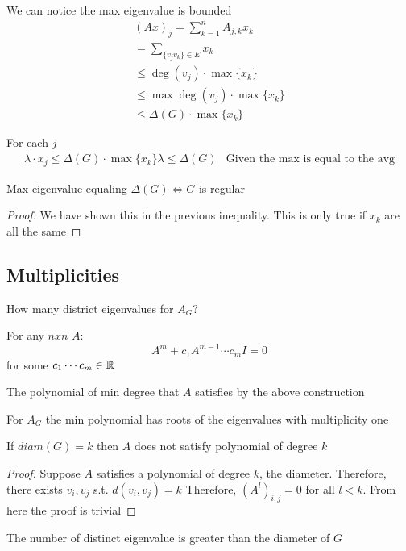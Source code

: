 We can notice the max eigenvalue is bounded
\begin{eqnarray*}
    (Ax)_j = \sum_{k = 1}^{n} A_{j,k} x_k \\ 
    = \sum_{\{v_jv_k\} \in E} x_k \\
    \leq \deg(v_j) \cdot \max\{x_k\} \\
    \leq \max \deg(v_j) \cdot \max\{x_k\} \\
    \leq \Delta(G) \cdot \max\{x_k\}
\end{eqnarray*}

For each \(j\)
\begin{eqnarray*}
    \lambda \cdot x_j \leq \Delta(G) \cdot \max \{x_k\}
    \lambda \leq \Delta(G) & \text{Given the max is equal to the avg} 
\end{eqnarray*}

\begin{theorem}[test]
    \label{thm:test}
    Max eigenvalue equaling \(\Delta (G) \iff G\) is regular 
\end{theorem} 
\begin{proof}
    We have shown this in the previous inequality. This is only true if \(x_k\) are all the same
\end{proof}

\subsection{Multiplicities}

\begin{question}
    How many district eigenvalues for \(A_G\)?
\end{question}

\begin{proposition}
    For any \(n x n\) \(A\):
    \[
        A^m + c_1 A^{m-1} \cdots c_m I = 0 
    \]
    for some \(c_1 \cdots c_m \in \mathbb{R}\)
\end{proposition}

\begin{definition}
    \label{def:min polynomial}
    The polynomial of min degree that \(A\) satisfies by the above construction

    For \(A_G\) the min polynomial has roots of the eigenvalues with multiplicity one
\end{definition}  

\begin{proposition}
    If \(diam(G) = k\) then \(A\) does not satisfy polynomial of degree \(k\) 
\end{proposition}
\begin{proof}
    Suppose \(A\) satisfies a polynomial of degree \(k\), the diameter. Therefore, there exists \(v_i, v_j\) s.t. \(d(v_i, v_j) = k\) Therefore, \((A^l)_{i,j} = 0\) for all \(l < k\). From here the proof is trivial
\end{proof}
\begin{corollary}
    The number of distinct eigenvalue is greater than the diameter of \(G\) 
\end{corollary}

